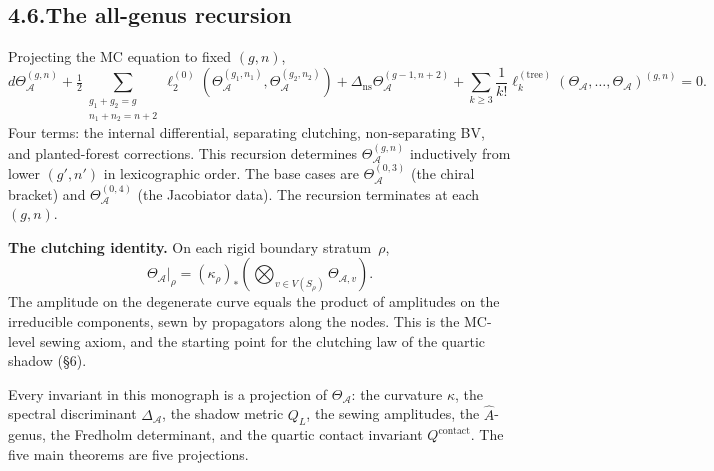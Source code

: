 \documentclass[11pt]{report}
\theoremstyle{definition}
\theoremstyle{remark}
\providecommand{\cA}{\mathcal{A}}
\numberwithin{equation}{section}
\begin{document}
\subsection*{4.6.\enspace The all-genus recursion}

Projecting the MC equation to fixed $(g,n)$,
\[
d\Theta^{(g,n)}_\cA+\tfrac12\!\!\!\sum_{\substack{g_1+g_2=g\\n_1+n_2=n+2}}\!\!\!\ell_2^{(0)}(\Theta^{(g_1,n_1)}_\cA,\Theta^{(g_2,n_2)}_\cA)+\Delta_{\mathrm{ns}}\Theta^{(g-1,n+2)}_\cA+\sum_{k\ge 3}\frac{1}{k!}\ell_k^{(\mathrm{tree})}(\Theta_\cA,\ldots,\Theta_\cA)^{(g,n)}=0.
\]
Four terms: the internal differential, separating clutching,
non-separating BV, and planted-forest corrections. This recursion
determines $\Theta^{(g,n)}_\cA$ inductively from lower $(g',n')$ in
lexicographic order. The base cases are
$\Theta^{(0,3)}_\cA$ (the chiral bracket) and $\Theta^{(0,4)}_\cA$
(the Jacobiator data). The recursion terminates at each $(g,n)$.

\medskip
\noindent\textbf{The clutching identity.}\enspace
On each rigid boundary stratum~$\rho$,
\[
\Theta_\cA\big|_\rho=(\kappa_\rho)_*\!\left(\bigotimes_{v\in V(S_\rho)}\Theta_{\cA,v}\right).
\]
The amplitude on the degenerate curve equals the product of amplitudes
on the irreducible components, sewn by propagators along the nodes.
This is the MC-level sewing axiom, and the starting point for the
clutching law of the quartic shadow (\S6).

\bigskip
\noindent
Every invariant in this monograph is a projection of $\Theta_\cA$:
the curvature $\kappa$, the spectral discriminant $\Delta_\cA$, the
shadow metric $Q_L$, the sewing amplitudes, the $\hat A$-genus, the
Fredholm determinant, and the quartic contact invariant
$Q^{\mathrm{contact}}$. The five main theorems are five projections.
\end{document}
